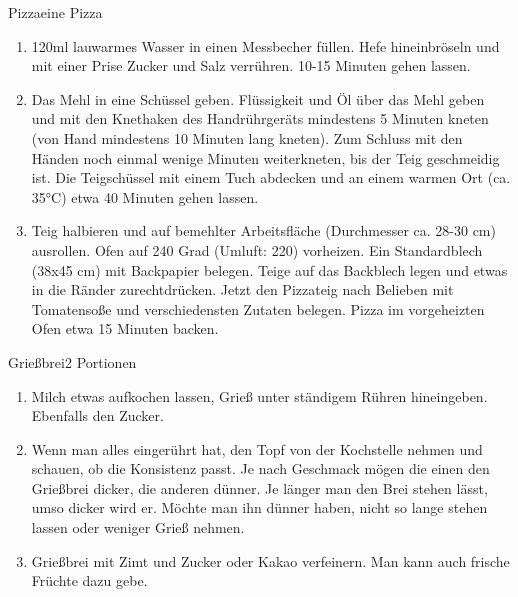 \documentclass{article}
\begin{document}
\begin{recipe}{Pizza}{eine Pizza}{}


\begin{enumerate}
\item 120ml lauwarmes Wasser in einen Messbecher füllen. Hefe hineinbröseln und mit einer Prise Zucker und Salz verrühren. 10-15 Minuten gehen lassen.
\item Das Mehl in eine Schüssel geben. Flüssigkeit und Öl über das Mehl geben und mit den Knethaken des Handrührgeräts mindestens 5 Minuten kneten (von Hand mindestens 10 Minuten lang kneten). Zum Schluss mit den Händen noch einmal wenige Minuten weiterkneten, bis der Teig geschmeidig ist. Die Teigschüssel mit einem Tuch abdecken und an einem warmen Ort (ca. 35°C) etwa 40 Minuten gehen lassen.
\item Teig halbieren und auf bemehlter Arbeitsfläche  (Durchmesser ca. 28-30 cm)  ausrollen. Ofen auf 240 Grad (Umluft: 220) vorheizen. Ein Standardblech (38x45 cm) mit Backpapier belegen. Teige auf das Backblech legen und etwas in die Ränder zurechtdrücken. Jetzt den Pizzateig nach Belieben mit Tomatensoße und verschiedensten Zutaten belegen. Pizza im vorgeheizten Ofen etwa 15 Minuten backen.
\end{enumerate}
\end{recipe}

\begin{recipe}{Grießbrei}{2 Portionen}{}



\begin{enumerate}
\item Milch etwas aufkochen lassen, Grieß unter ständigem Rühren hineingeben. Ebenfalls den Zucker.
\item Wenn man alles eingerührt hat, den Topf von der Kochstelle nehmen und schauen, ob die Konsistenz passt. Je nach Geschmack mögen die einen den Grießbrei dicker, die anderen dünner. Je länger man den Brei stehen lässt, umso dicker wird er. Möchte man ihn dünner haben, nicht so lange stehen lassen oder weniger Grieß nehmen.
\item Grießbrei mit Zimt und Zucker oder Kakao verfeinern. Man kann auch frische Früchte dazu gebe.
\end{enumerate}
\end{recipe}
\end{document}
